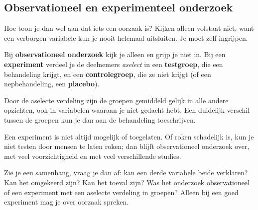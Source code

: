 \begin{oefeningen}
\end{oefeningen}

\subsection{Observationeel en experimenteel onderzoek}

Hoe toon je dan wel aan dat iets een oorzaak is? Kijken alleen volstaat niet, want een verborgen variabele kun je nooit helemaal uitsluiten. Je moet zelf ingrijpen.

\begin{theorie}
Bij \textbf{\textcolor{accent}{observationeel onderzoek}} kijk je alleen en grijp je niet in. Bij een \textbf{\textcolor{accent}{experiment}} verdeel je de deelnemers \textit{aselect} in een \textbf{\textcolor{accent}{testgroep}}, die een behandeling krijgt, en een \textbf{\textcolor{accent}{controlegroep}}, die ze niet krijgt (of een nepbehandeling, een \textbf{\textcolor{accent}{placebo}}).
\end{theorie}

Door de aselecte verdeling zijn de groepen gemiddeld gelijk in alle andere opzichten, ook in variabelen waaraan je niet gedacht hebt. Een duidelijk verschil tussen de groepen kun je dan aan de behandeling toeschrijven.


Een experiment is niet altijd mogelijk of toegelaten. Of roken schadelijk is, kun je niet testen door mensen te laten roken; dan blijft observationeel onderzoek over, met veel voorzichtigheid en met veel verschillende studies.

\begin{werkwijze}
Zie je een samenhang, vraag je dan af: kan een derde variabele beide verklaren? Kan het omgekeerd zijn? Kan het toeval zijn? Was het onderzoek observationeel of een experiment met een aselecte verdeling in groepen? Alleen bij een goed experiment mag je over oorzaak spreken.
\end{werkwijze}

